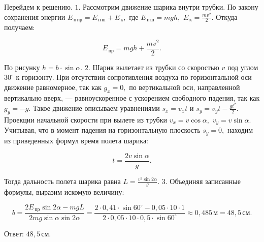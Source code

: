 \documentclass[12pt,a4paper]{article}
\begin{document}
{Перейдем к решению.
$1$.  Рассмотрим движение шарика внутри трубки. По закону сохранения энергии $E_{\,\text{п}\,\text{пр}}=E_{\,\text{п}\,\text{ш}} + E_{\,\text{к}},$ где $E_{\,\text{п}\,\text{ш}}=mgh,$ $E_{\,\text{к}}= \frac{m v ^2}{2} .$ Откуда получаем:

\[E_{\,\text{пр}}=mgh + \frac{m v ^2}{2} .\]

По рисунку $h=b \cdot \sin \alpha .$
$2$.  Шарик вылетает из трубки со скоростью $v$ под углом $30 ^\circ$ к горизонту. При отсутствии сопротивления воздуха по горизонтальной оси движение равномерное, так как $g_x=0,$ по вертикальной оси, направленной вертикально вверх,  — равноускоренное с ускорением свободного падения, так как $g_y= - g.$ Такое движение описываем уравнениями $s_x= v _xt$ и $s_y= v _yt - \frac{gt ^2}{2} .$ Проекции начальной скорости при вылете из трубки $v _x= v \cos \alpha ,$ $v _y= v \sin \alpha .$ Учитывая, что в момент падения на горизонтальную плоскость $s_y=0,$ находим из приведенных формул время полета шарика: 

\[t= \frac{2 v \sin \alpha}{g} .\]

Тогда дальность полета шарика равна $L= \frac{v ^2 \sin 2 \alpha}{g} .$
$3$.  Объединяя записанные формулы, выразим искомую величину:

\[b= \frac{2E_{\,\text{пр}} \sin 2 \alpha - mgL}{2mg \sin \alpha \sin 2 \alpha} = \frac{2 \cdot 0{,}41 \cdot \sin 60 ^\circ - 0{,}05 \cdot 10 \cdot 1}{2 \cdot 0{,}05 \cdot 10 \cdot 0{,}5 \cdot \sin 60 ^\circ} \approx 0{,}485\,\text{м}=48{,}5\,\text{см}.\]

Ответ: $48{,}5\,\text{см}$.
}
\end{document}
